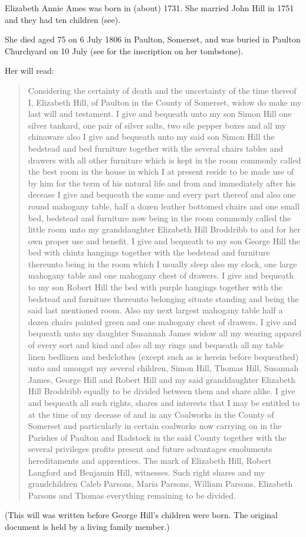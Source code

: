 
Elizabeth Annie Ames was born in (about) 1731.  She married John Hill in 1751 and they had ten children (see).

She died aged 75 on 6 July 1806 in Paulton, Somerset, and was buried in Paulton Churchyard on 10 July (see for the inscription on her tombstone).

Her will read:

\begin{quotation}
Considering the certainty of death and the uncertainty of the time thereof I, Elizabeth Hill, of Paulton in the County of Somerset, widow do make my last will and testament. I give and bequeath unto my son Simon Hill one silver tankard, one pair of silver salts, two sile pepper boxes and all my chinaware also I give and bequeath unto my said son Simon Hill the bedstead and bed furniture together with the several chairs tables and drawers with all other furniture which is kept in the room commonly called the best room in the house in which I at present reside to be made use of by him for the term of his natural life and from and immediately after his decease I give and bequeath the same and every part thereof and also one round mahogany table, half a dozen leather bottomed chairs and one small bed, bedstead and furniture now being in the room commonly called the little room unto my granddaughter Elizabeth Hill Broddribb to and for her own proper use and benefit. I give and bequeath to my son George Hill the bed with chintz hangings together with the bedstead and furniture thereunto being in the room which I usually sleep also my clock, one large mahogany table and one mahogany chest of drawers. I give and bequeath to my son Robert Hill the bed with purple hangings together with the bedstead and furniture thereunto belonging situate standing and being the said last mentioned room. Also my next largest mahogany table half a dozen chairs painted green and one mahogany chest of drawers. I give and bequeath unto my daughter Susannah James widow all my wearing apparel of every sort and kind and also all my rings and bequeath all my table linen bedlinen and bedclothes (except such as is herein before bequeathed) unto and amongst my several children, Simon Hill, Thomas Hill, Susannah James, George Hill and Robert Hill and my said granddaughter Elizabeth Hill Broddribb equally to be divided between them and share alike. I give and bequeath all such rights, shares and interests that I may be entitled to at the time of my decease of and in any Coalworks in the County of Somerset and particularly in certain coalworks now carrying on in the Parishes of Paulton and Radstock in the said County together with the several privileges profits present and future advantages emoluments hereditaments and apprentices. The mark of Elizabeth Hill, Robert Langford and Benjamin Hill, witnesses. Such right shares and my grandchildren Caleb Parsons, Maria Parsons, William Parsons, Elizabeth Parsons and Thomas everything remaining to be divided.
\end{quotation}

(This will was written before George Hill's children were born. The original document is held by a living family member.)
